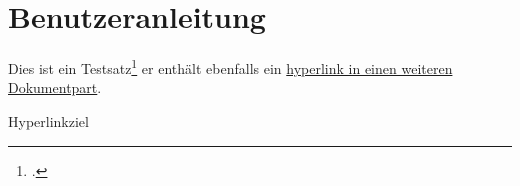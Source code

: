 \section{Benutzeranleitung}

Dies ist ein Testsatz\footcite{NASA:1} er enthält ebenfalls ein \hyperlink{testtarget}{hyperlink in einen weiteren Dokumentpart}.

\hypertarget{testtarget}{Hyperlinkziel}
